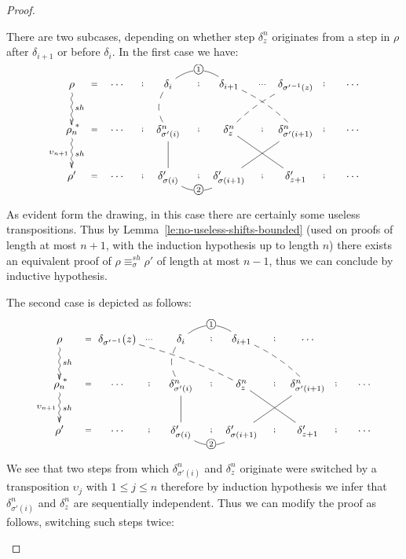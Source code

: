 \documentclass{llncs}
\newcommand{\perm}{\sigma}
\newcommand{\cycl}[1]{\ensuremath{\mbox{\textcircled{\scriptsize{$#1$}}}}}
\newcommand{\shifteq}[1][]{\ensuremath{\mathrel{{\equiv}^\mathit{sh}_{#1}}}}
\begin{document}
\begin{proof}
\begin{description}
There are two subcases, depending on whether step $\delta_z^n$ originates from a step in $\rho$ after $\delta_{i+1}$ or before $\delta_i$. In the first case we have:  
$$\xymatrix@C=2pc@R=2pc{
 \rho  \ar@{~>}[d]^{sh}^(.9){*} \ar@{}[r]|{=} &
   \cdots   \ar@{}[r]|{;}  &
    \delta_i \ar@{--}@/_2ex/[d]  \ar@{}[r]|{;} \ar@{-}@/^3ex/[r]|{\cycl{1}} &
   \delta_{i+1}  \ar@{--}@/^1ex/[dr]  \ar@{}[r]|{\cdots}  &
    \delta_{{\sigma'}^{-1}(z)} \ar@{--}@/_1ex/[dl]  \ar@{}[r]|{;}  & \cdots\\
\rho_n  \ar@{~>}[d]^{sh}_{\upsilon_{n+1}}  \ar@{}[r]|{=} &
   \cdots   \ar@{}[r]|{;}  &
    \delta^n_{\sigma'(i)} \ar@{-}[d]  \ar@{}[r]|{;}   &
   \delta^n_z \ar@{-}[dr]  \ar@{}[r]|{;} &
   \delta^n_{\sigma'(i+1)} \ar@{-}[dl]  \ar@{}[r]|{;} &
    \cdots\\
\rho'  \ar@{}[r]|{=} & 
    \cdots   \ar@{}[r]|{;}  &
     \delta'_{\sigma(i)} \ar@{}[r]|{;} \ar@{-}@/_3ex/[r]|{\cycl{2}} &
    \delta'_{\sigma(i+1)}  \ar@{}[r]|{;} &
    \delta'_{z+1}  \ar@{}[r]|{;} &
     \cdots  \\
}$$

As evident form the drawing, in this case there are certainly some useless transpositions. Thus by Lemma~\ref{le:no-useless-shifts-bounded} (used on proofs of length at most $n+1$, with the induction hypothesis up to length $n$) there exists an equivalent proof of $\rho \shifteq[\perm] \rho'$  of length at most $n-1$, thus we can conclude by inductive hypothesis. 

The second case is depicted as follows:

$$\xymatrix@C=2pc@R=2pc{
 \rho  \ar@{~>}[d]^{sh}^(.9){*} \ar@{}[r]|{=} &
   \delta_{{\sigma'}^{-1}}(z)  \ar@{--}@/^1ex/[drr]   \ar@{}[r]|{\cdots}  &
    \delta_i \ar@{--}@/_2ex/[d]  \ar@{}[r]|{;} \ar@{-}@/^3ex/[r]|{\cycl{1}} &
    \delta_{i+1} \ar@{--}@/^1ex/[dr]  \ar@{}[r]|{;}  & \cdots\\
\rho_n  \ar@{~>}[d]^{sh}_{\upsilon_{n+1}}  \ar@{}[r]|{=} &
   \cdots   \ar@{}[r]|{;}  &
    \delta^n_{\sigma'(i)} \ar@{-}[d]  \ar@{}[r]|{;}   &
   \delta^n_z \ar@{-}[dr]  \ar@{}[r]|{;} &
   \delta^n_{\sigma'(i+1)} \ar@{-}[dl]  \ar@{}[r]|{;} &
    \cdots\\
\rho'  \ar@{}[r]|{=} & 
    \cdots   \ar@{}[r]|{;}  &
     \delta'_{\sigma(i)} \ar@{}[r]|{;} \ar@{-}@/_3ex/[r]|{\cycl{2}} &
    \delta'_{\sigma(i+1)}  \ar@{}[r]|{;} &
    \delta'_{z+1}  \ar@{}[r]|{;} &
     \cdots  \\
}$$

We see that two steps from which $\delta^n_{\sigma'(i)}$ and $\delta^n_z$ originate were switched by a transposition $\upsilon_j$ with $1 \leq j \leq n$ therefore by induction hypothesis we infer that  $\delta^n_{\sigma'(i)}$ and $\delta^n_z$ are sequentially independent. Thus we can modify the proof as follows, switching such steps twice:
 

\end{description}
\end{proof}
\end{document}
